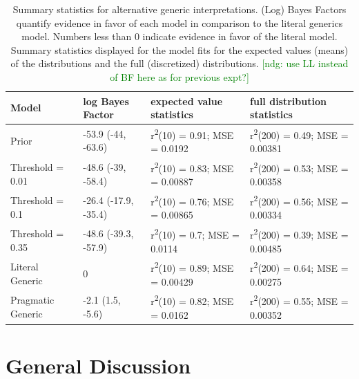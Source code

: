\documentclass[floatsintext,doc]{apa6}
\newcommand{\ndg}[1]{{\textcolor{Green}{[ndg: #1]}}}
\newcommand{\red}[1]{{\textcolor{Red}{#1}}}
\begin{document}
\begin{table}[h]
\centering
\begingroup\fontsize{9pt}{10pt}\selectfont
\begin{tabular}{llll}
  \hline
Model & log Bayes Factor & expected value statistics & full distribution statistics \\ 
  \hline
Prior & -53.9 (-44, -63.6) & r\textsuperscript{2}(10) = 0.91; MSE = 0.0192 & r\textsuperscript{2}(200) = 0.49; MSE = 0.00381 \\ 
  Threshold = 0.01 & -48.6 (-39, -58.4) & r\textsuperscript{2}(10) = 0.83; MSE = 0.00887 & r\textsuperscript{2}(200) = 0.53; MSE = 0.00358 \\ 
  Threshold = 0.1 & -26.4 (-17.9, -35.4) & r\textsuperscript{2}(10) = 0.76; MSE = 0.00865 & r\textsuperscript{2}(200) = 0.56; MSE = 0.00334 \\ 
  Threshold = 0.35 & -48.6 (-39.3, -57.9) & r\textsuperscript{2}(10) = 0.7; MSE = 0.0114 & r\textsuperscript{2}(200) = 0.39; MSE = 0.00485 \\ 
  Literal Generic & 0 & r\textsuperscript{2}(10) = 0.89; MSE = 0.00429 & r\textsuperscript{2}(200) = 0.64; MSE = 0.00275 \\ 
  Pragmatic Generic & -2.1 (1.5, -5.6) & r\textsuperscript{2}(10) = 0.82; MSE = 0.0162 & r\textsuperscript{2}(200) = 0.55; MSE = 0.00352 \\ 
   \hline
\end{tabular}
\endgroup
\caption{Summary statistics for alternative generic interpretations. (Log) Bayes Factors quantify evidence in favor of each model in comparison to the literal generics model. Numbers less than 0 indicate evidence in favor of the literal model. Summary statistics displayed for the model fits for the expected values (means) of the distributions and the full (discretized) distributions. \ndg{use LL instead of BF here as for previous expt?}} 
\end{table}

\hypertarget{general-discussion}{%
\section{General Discussion}\label{general-discussion}}


\end{document}
